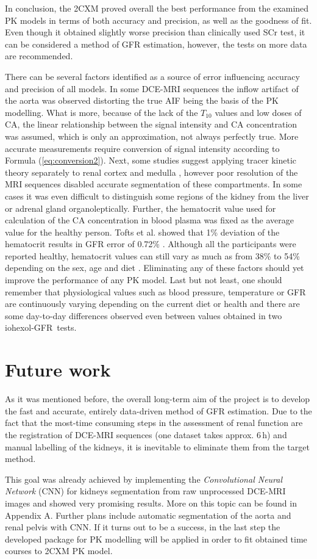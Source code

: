 In conclusion, the 2CXM proved overall the best performance from the examined PK models in terms of both accuracy and precision, as well as the goodness of fit. Even though it obtained slightly worse precision than clinically used SCr test, it can be considered a method of GFR estimation, however, the tests on more data are recommended.      


There can be several factors identified as a source of error influencing accuracy and precision of all models. In some DCE-MRI sequences the inflow artifact of the aorta was observed distorting the true AIF being the basis of the PK modelling.   
What is more, because of the lack of the $T_{10}$ values and low doses of CA, the linear relationship between the signal intensity and CA concentration was assumed, which is only an approximation, not always perfectly true. More accurate measurements require conversion of signal intensity according to Formula (\ref{eq:conversion2}).  
Next, some studies suggest applying tracer kinetic theory separately to renal cortex and medulla \cite{baumann2000quantitative, lee2007renal}, however poor resolution of the MRI sequences disabled accurate segmentation of these compartments. In some cases it was even difficult to distinguish some regions of the kidney from the liver or adrenal gland organoleptically.   
Further, the hematocrit value used for calculation of the CA concentration in blood plasma was fixed as the average value for the  healthy person. Tofts et al. \cite{tofts2012precise} showed that  1\% deviation of the hematocrit results in GFR error of 0.72\% . Although all the participants were reported healthy, hematocrit values can still vary as much as from 38\% to 54\% depending on the sex, age and diet \cite{hct}. Eliminating any of these factors should yet improve the performance of any PK model.   
Last but not least, one should remember that physiological values such as blood pressure, temperature or GFR are continuously varying depending on the current diet or health and there are some day-to-day differences observed even between values obtained in two iohexol-GFR~tests.

\section{Future work}
As it was mentioned before, the overall long-term aim of the project is to develop the fast and accurate, entirely data-driven method of GFR estimation. Due to the fact that the most-time consuming steps in the assessment of renal function are the registration of DCE-MRI sequences (one dataset takes approx. 6\,h) and manual labelling of the kidneys, it is inevitable to eliminate them from the target method.   

This goal was already achieved by implementing the \textit{Convolutional Neural Network} (CNN) for kidneys segmentation from raw unprocessed DCE-MRI images  and showed very promising results. 
More on this topic can be found in Appendix A. Further plans include automatic segmentation of the aorta and renal pelvis with CNN. If it turns out to be a success, in the last step the developed package for PK modelling will be applied in order to fit obtained time courses to 2CXM PK model.